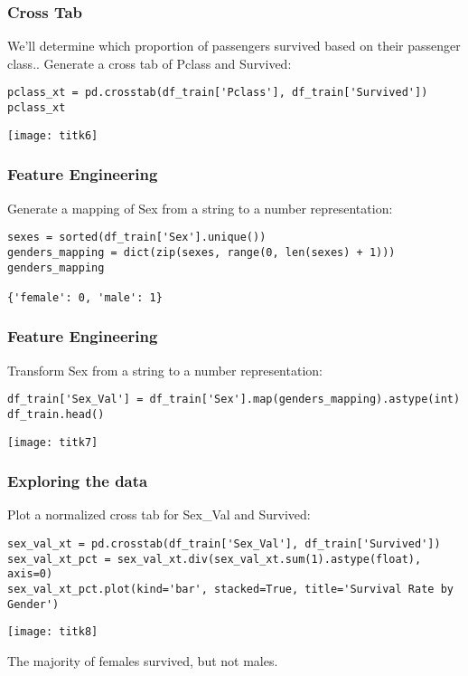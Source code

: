 \begin{frame}[fragile]\frametitle{Cross Tab}
We'll determine which proportion of passengers survived based on their passenger class.. Generate a cross tab of Pclass and Survived:
\begin{lstlisting}
pclass_xt = pd.crosstab(df_train['Pclass'], df_train['Survived'])
pclass_xt
\end{lstlisting}
\begin{center}
\texttt{[image: titk6]}
\end{center}
\end{frame}


\begin{frame}[fragile]\frametitle{Feature Engineering}
Generate a mapping of Sex from a string to a number representation:
\begin{lstlisting}
sexes = sorted(df_train['Sex'].unique())
genders_mapping = dict(zip(sexes, range(0, len(sexes) + 1)))
genders_mapping

{'female': 0, 'male': 1}
\end{lstlisting}
\end{frame}


\begin{frame}[fragile]\frametitle{Feature Engineering}
Transform Sex from a string to a number representation:
\begin{lstlisting}
df_train['Sex_Val'] = df_train['Sex'].map(genders_mapping).astype(int)
df_train.head()
\end{lstlisting}
\begin{center}
\texttt{[image: titk7]}
\end{center}
\end{frame}

\begin{frame}[fragile]\frametitle{Exploring  the data}
Plot a normalized cross tab for Sex\_Val and Survived:
\begin{lstlisting}
sex_val_xt = pd.crosstab(df_train['Sex_Val'], df_train['Survived'])
sex_val_xt_pct = sex_val_xt.div(sex_val_xt.sum(1).astype(float), axis=0)
sex_val_xt_pct.plot(kind='bar', stacked=True, title='Survival Rate by Gender')
\end{lstlisting}
\begin{center}
\texttt{[image: titk8]}
\end{center}
The majority of females survived, but not males.
\end{frame}

